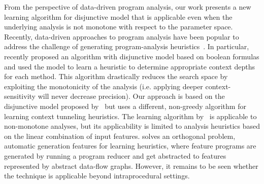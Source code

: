 

From the perspective of data-driven program analysis, our work
presents a new learning algorithm for disjunctive model that is
applicable even when the
underlying analysis is not monotone with respect to the parameter
space.
Recently, data-driven approaches to program analysis have been
popular to address the challenge of generating program-analysis
heuristics~\cite{JeJeChOh17,Oh2015,ChOhHeYa17,Heo2016learning,heo2016unsound,WeiR15}.
In particular, \citet{JeJeChOh17} recently proposed an algorithm with
disjunctive model based on boolean formulas and used the model to
learn a heuristic to determine appropriate context depths for each
method. This algorithm drastically reduces the search space by
exploiting the monotonicity of the analysis (i.e. applying deeper context-sensitivity will never decrease precision). Our approach is based on the
disjunctive model proposed by~\cite{JeJeChOh17} but uses a
different, non-greedy algorithm for learning context tunneling
heuristics.
The learning algorithm by~\citet{Oh2015} is applicable to non-monotone
analyses, but its applicability is limited to analysis heuristics
based on the linear combination of input features.
\citet{ChOhHeYa17} solves an orthogonal problem, automatic
generation features for learning heuristics, where feature programs
are generated by running a program reducer and get abstracted to
features represented by abstract data-flow graphs. However, it remains
to be seen whether the technique is applicable beyond intraprocedural
settings.


